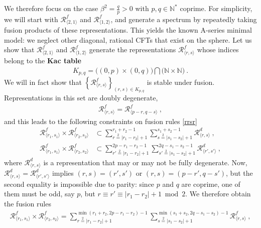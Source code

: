 \documentclass[12pt, a4paper]{article}
\newcommand{\myindex}[1]{\textbf{\boldmath #1}}
\begin{document}
We therefore focus on the case $\beta^2 = \frac{q}{p}>0$ with $p,q\in\mathbb{N}^*$ coprime. For simplicity, we will start with $\mathcal{R}^f_{\langle 2,1\rangle}$ and $\mathcal{R}^f_{\langle 1,2\rangle}$, and generate a spectrum by repeatedly taking fusion products of these representations. This yields the known A-series minimal model: we neglect other diagonal, rational CFTs that exist on the sphere.
Let us show that $\mathcal{R}^f_{\langle 2,1\rangle}$ and $\mathcal{R}^f_{\langle 1,2\rangle}$ generate the representations $\mathcal{R}^f_{\langle r,s\rangle}$  whose indices belong to the \myindex{Kac table}
\begin{align}
 \boxed{ K_{p, q}=  \big((0,p)\times (0,q)\big)\bigcap \big(\mathbb{N}\times \mathbb{N}\big) }\ .
 \label{kac}
\end{align}
We will in fact show that $\left\{\mathcal{R}^f_{\langle r,s\rangle}\right\}_{(r,s)\in K_{p, q}}$ is stable under fusion. Representations in this set are doubly degenerate, 
\begin{align}
 \mathcal{R}^f_{\langle r,s\rangle} = \mathcal{R}^f_{\langle p-r,q-s\rangle}\ , 
 \label{prqs}
\end{align}
and this leads to the following constraints on fusion rules \eqref{rrsr}
\begin{subequations}
\begin{align}
 \mathcal{R}^f_{\langle r_1,s_1\rangle} \times \mathcal{R}^f_{\langle r_2,s_2\rangle} &\subset \sum_{r\overset{2}{=} |r_1-r_2|+1}^{r_1+r_2-1}\sum_{s\overset{2}{=} |s_1-s_2|+1}^{s_1+s_2-1} \mathcal{R}^d_{\langle r,s\rangle} \ , 
 \\
 \mathcal{R}^f_{\langle r_1,s_1\rangle} \times \mathcal{R}^f_{\langle r_2,s_2\rangle} &\subset \sum_{r'\overset{2}{=} |r_1-r_2|+1}^{2p-r_1-r_2-1} \sum_{s'\overset{2}{=} |s_1-s_2|+1}^{2q-s_1-s_2-1}\mathcal{R}^d_{\langle r',s'\rangle} \ , 
\end{align}
\end{subequations}
where $\mathcal{R}^d_{\langle r,s\rangle}$ is a representation that may or may not be fully degenerate. Now, $\mathcal{R}^d_{\langle r,s\rangle} = \mathcal{R}^d_{\langle r',s'\rangle}$ implies $(r,s)=(r',s')$ or $(r,s)=(p-r',q-s')$, but the second equality is impossible due to parity: since $p$ and $q$ are coprime, one of them must be odd, say $p$, but $r\equiv r'\equiv |r_1-r_2|+1\bmod 2$. We therefore obtain the fusion rules 
\begin{align}
 \boxed{\mathcal{R}^f_{\langle r_1,s_1\rangle} \times \mathcal{R}^f_{\langle r_2,s_2\rangle} = \sum_{r\overset{2}{=} |r_1-r_2|+1}^{\min(r_1+r_2,2p-r_1-r_2)-1}\sum_{s\overset{2}{=} |s_1-s_2|+1}^{\min(s_1+s_2,2q-s_1-s_2)-1} \mathcal{R}^f_{\langle r,s\rangle}} \ , 
 \label{rfrf}
\end{align}
\end{document}
